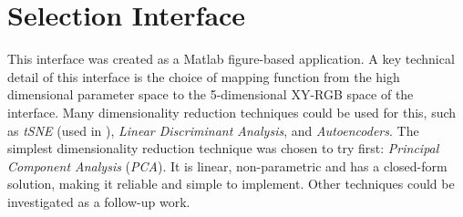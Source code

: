 \documentclass[11pt, oneside]{report}   	%
\begin{document}
\section{Selection Interface}\label{sec:SelectionDescription}
This interface was created as a Matlab figure-based application. A key technical detail of this interface is the choice of mapping function from the high dimensional parameter space to the 5-dimensional XY-RGB space of the interface. Many dimensionality reduction techniques could be used for this, such as \emph{tSNE} (used in \cite{InfiniteDrum}), \emph{Linear Discriminant Analysis}, and \emph{Autoencoders}. The simplest dimensionality reduction technique was chosen to try first: \emph{Principal Component Analysis} (\emph{PCA}). It is linear, non-parametric and has a closed-form solution, making it reliable and simple to implement. Other techniques could be investigated as a follow-up work.
\end{document}
